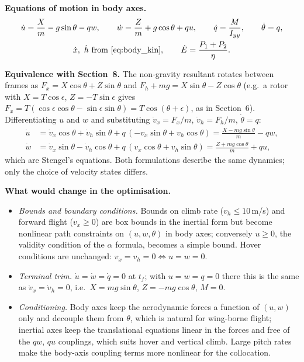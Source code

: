 \documentclass[10pt,a4paper]{article}
\begin{document}
\textbf{Equations of motion in body axes.}
\begin{gather}
\dot u = \frac{X}{m} - g\sin\theta - q w, \qquad
\dot w = \frac{Z}{m} + g\cos\theta + q u, \qquad
\dot q = \frac{M}{I_{yy}}, \qquad \dot\theta = q, \\
\dot x,\ \dot h \ \text{from \eqref{eq:body_kin}}, \qquad \dot E = \frac{P_1+P_2}{\eta}.
\end{gather}

\textbf{Equivalence with Section~8.} The non-gravity resultant rotates between frames as
$F_x = X\cos\theta + Z\sin\theta$ and $F_h + mg = X\sin\theta - Z\cos\theta$ (e.g.\ a rotor with
$X = T\cos\epsilon$, $Z = -T\sin\epsilon$ gives $F_x = T(\cos\epsilon\cos\theta - \sin\epsilon\sin\theta) = T\cos(\theta+\epsilon)$, as in Section~6).
Differentiating $u$ and $w$ and substituting $\dot v_x = F_x/m$, $\dot v_h = F_h/m$, $\dot\theta = q$:
\begin{align}
\dot u &= \dot v_x\cos\theta + \dot v_h\sin\theta + q\,(-v_x\sin\theta + v_h\cos\theta)
       = \frac{X - mg\sin\theta}{m} - q w, \\
\dot w &= \dot v_x\sin\theta - \dot v_h\cos\theta + q\,(v_x\cos\theta + v_h\sin\theta)
       = \frac{Z + mg\cos\theta}{m} + q u,
\end{align}
which are Stengel's equations. Both formulations describe the same dynamics; only the choice of
velocity states differs.

\textbf{What would change in the optimisation.}
\begin{itemize}\setlength{\itemsep}{1pt}
\item \emph{Bounds and boundary conditions.} Bounds on climb rate ($v_h \le 10$\,m/s) and forward flight ($v_x \ge 0$) are
box bounds in the inertial form but become nonlinear path constraints on $(u, w, \theta)$ in body axes;
conversely $u \ge 0$, the validity condition of the $\alpha$ formula, becomes a simple bound.
Hover conditions are unchanged: $v_x = v_h = 0 \Leftrightarrow u = w = 0$.
\item \emph{Terminal trim.} $\dot u = \dot w = \dot q = 0$ at $t_f$; with $u = w = q = 0$ there this is the same as
$\dot v_x = \dot v_h = 0$, i.e.\ $X = mg\sin\theta$, $Z = -mg\cos\theta$, $M = 0$.
\item \emph{Conditioning.} Body axes keep the aerodynamic forces a function of $(u,w)$ only and decouple them from
$\theta$, which is natural for wing-borne flight; inertial axes keep the translational equations linear in the
forces and free of the $q w$, $q u$ couplings, which suits hover and vertical climb. Large pitch rates make the
body-axis coupling terms more nonlinear for the collocation.
\end{itemize}
\end{document}
